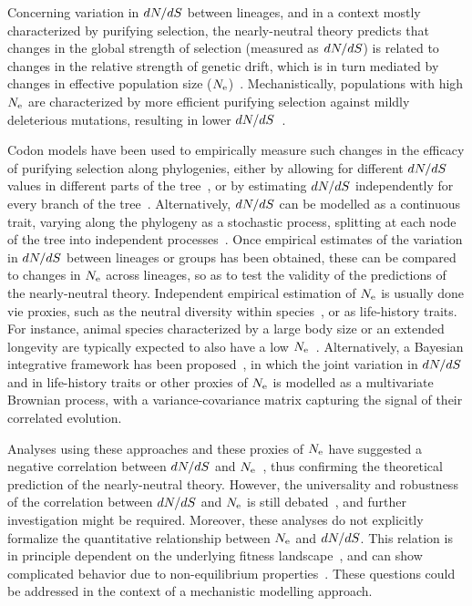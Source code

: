 Concerning variation in $dN/dS$ between lineages, and in a context mostly characterized by purifying selection, the \gls{nearly-neutral} theory predicts that changes in the global strength of selection (measured as $dN/dS$) is related to changes in the relative strength of \gls{genetic drift}, which is in turn mediated by changes in \gls{effective population size} ($N_{\text{e}}$)~\citep{Ohta1992}.
Mechanistically, populations with high $N_{\text{e}}$ are characterized by more efficient purifying selection against mildly deleterious mutations, resulting in lower $dN/dS$~\citep{Kimura1979, Welch2008}.

Codon models have been used to empirically measure such changes in the efficacy of purifying selection along phylogenies, either by allowing for different $dN/dS$ values in different parts of the tree~\citep{Dutheil2012}, or by estimating $dN/dS$ independently for every branch of the tree~\citep{Popadin2007}.
Alternatively, $dN/dS$ can be modelled as a continuous trait, varying along the phylogeny as a stochastic process, splitting at each node of the tree into independent processes~\citep{Seo2004}.
Once empirical estimates of the variation in $dN/dS$ between lineages or groups has been obtained, these can be compared to changes in $N_{\text{e}}$ across lineages, so as to test the validity of the predictions of the \gls{nearly-neutral} theory.
Independent empirical estimation of $N_{\text{e}}$ is usually done vie proxies, such as the \gls{neutral} diversity within species~\citep{Galtier2016}, or as life-history traits.
For instance, animal species characterized by a large body size or an extended longevity are typically expected to also have a low $N_{\text{e}}$~\citep{Romiguier2014}.
Alternatively, a Bayesian integrative framework has been proposed~\citep{Lartillot2011}, in which the joint variation in $dN/dS$ and in life-history traits or other proxies of $N_{\text{e}}$ is modelled as a multivariate Brownian process, with a variance-covariance matrix capturing the signal of their correlated evolution.

Analyses using these approaches and these proxies of $N_{\text{e}}$ have suggested a negative correlation between $dN/dS$ and $N_{\text{e}}$~\citep{Popadin2007, Lanfear2010, Lartillot2011, Lartillot2012, Romiguier2014, Figuet2017}, thus confirming the theoretical prediction of the \gls{nearly-neutral} theory.
However, the universality and robustness of the correlation between $dN/dS$ and $N_{\text{e}}$ is still debated~\citep{Nabholz2013,Lanfear2014,Figuet2016, Bolivar2019}, and further investigation might be required.
Moreover, these analyses do not explicitly formalize the quantitative relationship between $N_{\text{e}}$ and $dN/dS$.
This relation is in principle dependent on the underlying fitness landscape~\citep{Welch2008}, and can show complicated behavior due to non-equilibrium properties~\citep{Jones2016}.
These questions could be addressed in the context of a mechanistic modelling approach.

